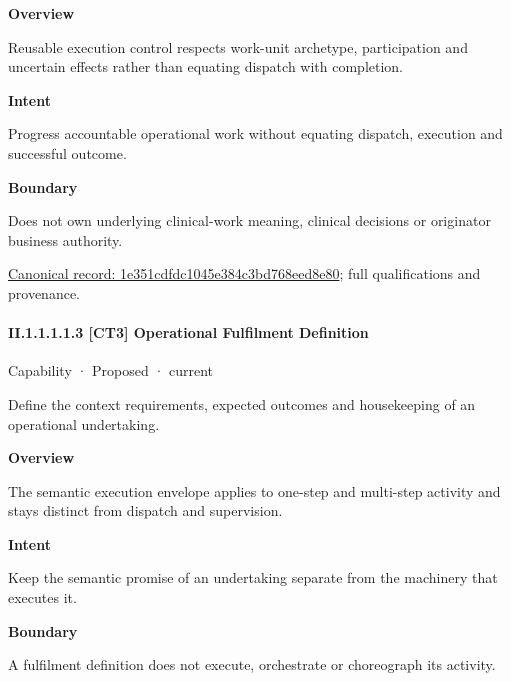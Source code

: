 \textbf{Overview}



Reusable execution control respects work-unit archetype, participation and uncertain effects rather than equating dispatch with completion.



\textbf{Intent}



Progress accountable operational work without equating dispatch, execution and successful outcome.



\textbf{Boundary}



Does not own underlying clinical-work meaning, clinical decisions or originator business authority.


{\footnotesize \href{../../../../continuum/strategy/capability/1e351cdfdc1045e384c3bd768eed8e80.md}{Canonical record: 1e351cdfdc1045e384c3bd768eed8e80}; full qualifications and provenance.}\par
\paragraph*{II.1.1.1.1.3 [CT3] Operational Fulfilment Definition}
\label{navigation:II.1.1.1.1.3}

\label{element:2b52c0de17b146da962f303e99f90a4a}
{\small Capability · Proposed · current}\par

Define the context requirements, expected outcomes and housekeeping of an operational undertaking.



\textbf{Overview}



The semantic execution envelope applies to one-step and multi-step activity and stays distinct from dispatch and supervision.



\textbf{Intent}



Keep the semantic promise of an undertaking separate from the machinery that executes it.



\textbf{Boundary}



A fulfilment definition does not execute, orchestrate or choreograph its activity.


